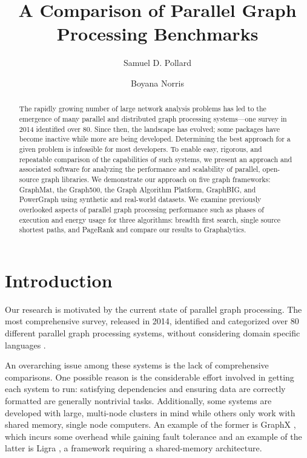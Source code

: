 \documentclass{llncs}
\begin{document}
\title{A Comparison of Parallel Graph Processing Benchmarks}
\author{Samuel D. Pollard \and Boyana Norris}
\maketitle
\begin{abstract}
The rapidly growing number of large network analysis problems has led to the emergence of many parallel and distributed graph processing systems---one survey in 2014 identified over 80. Since then, the landscape has evolved; some packages have become inactive while more are being developed. Determining the best approach for a given problem is infeasible for most developers. To enable easy, rigorous, and repeatable comparison of the capabilities of such systems, we present an approach and associated software for analyzing the performance and scalability of parallel, open-source graph libraries. We demonstrate our approach on five graph frameworks: GraphMat, the Graph500, the Graph Algorithm Platform, GraphBIG, and PowerGraph using synthetic and real-world datasets. We examine previously overlooked aspects of parallel graph processing performance such as phases of execution and energy usage for three algorithms: breadth first search, single source shortest paths, and PageRank and compare our results to Graphalytics.
\end{abstract}

\section{Introduction}

Our research is motivated by the current state of parallel graph processing. The most comprehensive survey, released in 2014, identified and categorized over 80 different parallel graph processing systems, without considering domain specific languages \cite{Doekemeijer:2015:GPFSurvey}.

An overarching issue among these systems is the lack of comprehensive comparisons. One possible reason is the considerable effort involved in getting each system to run: satisfying dependencies and ensuring data are correctly formatted are generally nontrivial tasks. Additionally, some systems are developed with large, multi-node clusters in mind while others only work with shared memory, single node computers. An example of the former is GraphX \cite{Xin:2013:GraphX}, which incurs some overhead while gaining fault tolerance and an example of the latter is Ligra \cite{Shun:2013:Ligra}, a framework requiring a shared-memory architecture.
\end{document}
